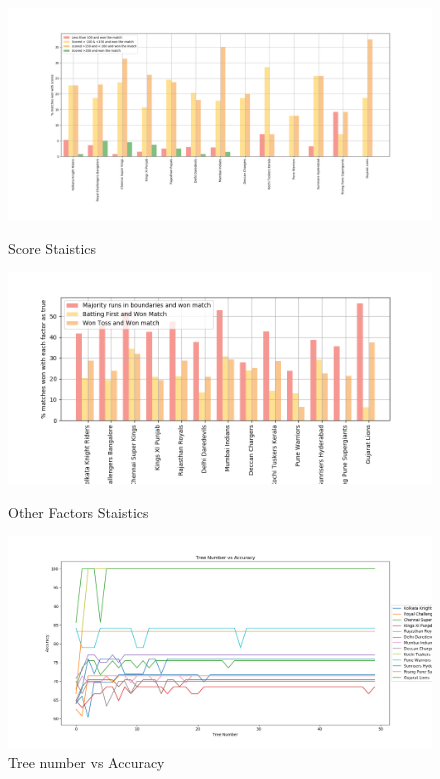 \documentclass[sigconf]{acmart}
\begin{document}
\begin{figure}[!ht]
  \centering\includegraphics[width=\columnwidth]{images/scorestatictics.png}
  \caption{Score Staistics}\label{f:scorestats}
  
   \centering\includegraphics[width=\columnwidth]{images/otherstatistics.png}
  \caption{Other Factors Staistics}\label{f:otherstats}
  
  \centering\includegraphics[width=\columnwidth]{images/treenumvsaccuracy.png}
  \caption{Tree number vs Accuracy}\label{f:treenumvsaccuracy}
  

\end{figure}
\end{document}
